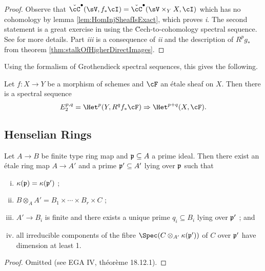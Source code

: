 \begin{proof}
Observe that $\check\cC^\bullet(\sV, f_*\cI) = \check\cC^\bullet(\sV\times_Y X, \cI)$ which has no cohomology by lemma \ref{lem:HomInjSheafIsExact}, which proves {\it i}. The second statement is a great exercise in using the \u Cech-to-cohomology spectral sequence. See \cite{Stacks} for more details. Part {\it iii} is a consequence of {\it ii} and the description of $R^pg_*$ from theorem \ref{thm:stalkOfHigherDirectImages}. 
\end{proof}

Using the formalism of Grothendieck spectral sequences, this gives the following.

\begin{prop}
Let $f: X \to Y$ be a morphism of schemes and $\cF$ an \'etale sheaf on $X$. Then there is a spectral sequence
$$
E_2^{p,q} = \Het^p(Y, R^qf_*\cF) \Rightarrow \Het^{p+q}(X, \cF).
$$
\end{prop}

\subsection{Henselian Rings}

\begin{thm} 
Let $A\to B$ be finite type ring map and $\frak p \subseteq A$ a prime ideal. Then there exist an \'etale ring map $A \to A'$ and a prime $\frak p' \subseteq A'$ lying over $\frak p$ such that 
\begin{enumerate}[i.]
\item 
$\kappa(\frak p) = \kappa(\frak p')$ ;
\item 
$ B \otimes_A A' = B_1\times \cdots \times B_r \times C$ ;
\item 
$ A'\to B_i$ is finite and there exists a unique prime $q_i\subseteq B_i$ lying over $\frak p'$ ; and
\item 
all irreducible components of the fibre $\Spec(C\otimes_{A'} \kappa(\frak p'))$ of $C$ over $\frak p'$ have dimension at least 1.
\end{enumerate}
\end{thm}

\begin{proof}
Omitted (see EGA IV, th\'eor\`eme 18.12.1).
\end{proof}


